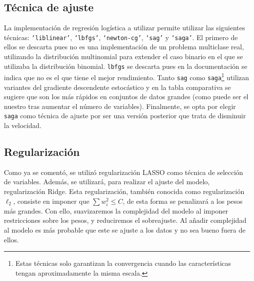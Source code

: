 \documentclass[a4paper, 20pt]{article}
\begin{document}
{\subsection{Técnica de ajuste}
La implementación de regresión logística a utilizar \cite{lreg} permite utilizar las siguientes técnicas: \texttt{‘liblinear’}, \texttt{‘lbfgs’}, \texttt{‘newton-cg’}, \texttt{‘sag’} y \texttt{‘saga’}. El primero de ellos se descarta pues no es una implementación de un problema multiclase real, utilizando la distribución multinomial para extender el caso binario en el que se utilizaba la distribución binomial. \texttt{lbfgs} se descarta pues en la documentación se indica que no es el que tiene el mejor rendimiento. Tanto \texttt{sag} como \texttt{saga}\footnote{Estas técnicas solo garantizan la convergencia cuando las características tengan aproximadamente la misma escala.} utilizan variantes del gradiente descendente estocástico y en la tabla comparativa se sugiere que son los más rápidos en conjuntos de datos grandes (como puede ser el nuestro tras aumentar el número de variables). Finalmente, se opta por elegir \texttt{saga} como técnica de ajuste por ser una versión posterior que trata de disminuir la velocidad.


\subsection{Regularización}

Como ya se comentó, se utilizó regularización LASSO como técnica de selección de variables. Además, se utilizará, para realizar el ajuste del modelo, regularización Ridge. Esta regularización, también conocida como regularización $\ell_2$, consiste en imponer que $\sum w_i^2 \leq C$, de esta forma se penalizará a los pesos más grandes. Con ello, suavizaremos la complejidad del modelo al imponer restricciones sobre los pesos, y reduciremos el sobreajuste. Al añadir complejidad al modelo es más probable que este se ajuste a los datos y no sea bueno fuera de ellos.

}
\end{document}
